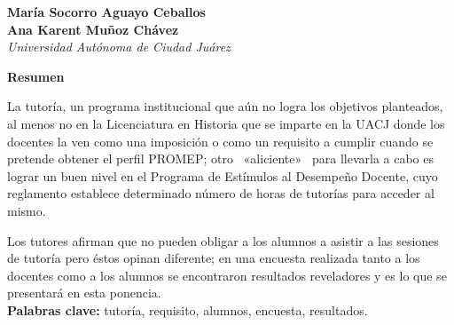 %
\thispagestyle{empty}
{\par}
\setcounter{footnote}{0}

\bigskip
\begin{center}
{\bfseries María Socorro Aguayo Ceballos\\
Ana Karent Muñoz Chávez}\\
{\itshape Universidad Autónoma de Ciudad Juárez}
\end{center}

\bigskip
\textbf{Resumen}

La tutoría, un programa institucional que aún no logra los objetivos
planteados, al menos no en la Licenciatura en Historia que se imparte en la
 UACJ donde los docentes la ven como una imposición o como un requisito a
cumplir cuando se pretende obtener el perfil PROMEP; otro \ «aliciente» \ para
llevarla a cabo es lograr un buen nivel en el Pro\-gra\-ma de Estímulos al
Desempeño Docente, cuyo reglamento establece determinado número de horas de
tutorías para  acceder al mismo.


Los tutores afirman que no pueden obligar a los alumnos a asistir a las
sesiones de tutoría pero éstos opinan diferente; en una encuesta realizada
tanto a los docentes como a los alumnos se encontraron resultados
reveladores y es lo que se presentará en esta ponencia.\\
\textbf{Palabras clave:} tutoría, requisito, alumnos, encuesta, resultados.


